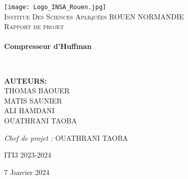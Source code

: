 

\begin{titlepage}
  \begin{center}

    \texttt{[image: Logo\_INSA\_Rouen.jpg]}~\\[1.5cm]

    \textsc{\LARGE Institue Des Sciences Apliquées ROUEN NORMANDIE}\\[2cm]

    \textsc{\Large Rapport de projet}\\[2cm]

   \HRule \\[0.4cm]
    { \huge \bfseries Compresseur d'Huffman\\[0.4cm] }

    \HRule \\[2cm]
    
   

    \begin{minipage}{0.4\textwidth}
      \begin{flushleft} \large
       \textbf{AUTEURS:}\\
   \textsc{ THOMAS BAOUER\\
    MATIS SAUNIER\\
    ALI HAMDANI\\
    OUATHRANI TAOBA}\\
      
       
      \end{flushleft}
    \end{minipage}
    \begin{minipage}{0.4\textwidth}
      \begin{flushright} \large
        \emph{Chef de projet : } OUATHRANI TAOBA 
      \end{flushright}
    \end{minipage}
  
\begin{minipage}[b]{0.2\textwidth}
        ITI3 2023-2024
    \end{minipage}
    
    \vfill
 
 {\large 7 Janvier 2024}


  \end{center}
\end{titlepage}



    
